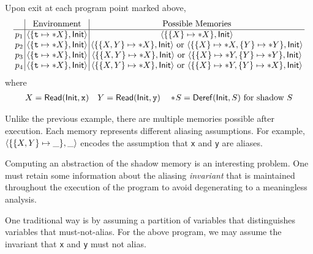 \documentclass{article}
\begin{document}
Upon exit at each program point marked above,
\[
  \setlength{\arraycolsep}{2pt}
  \begin{array}{c|c|c}
              & \text{Environment}                                      & \text{Possible Memories}                                                                                                                                                                \\
    \hline
    \ppoint_1 & \langle\{\texttt{t}\mapsto*\abbrtext{X}\},\InitE\rangle & \langle\{\{\abbrtext{X}\}\mapsto*\abbrtext{X}\},\InitE\rangle                                                                                                                           \\
    \ppoint_2 & \langle\{\texttt{t}\mapsto*\abbrtext{X}\},\InitE\rangle & \langle\{\{\abbrtext{X},\abbrtext{Y}\}\mapsto*\abbrtext{X}\},\InitE\rangle\text{ or }\langle\{\{\abbrtext{X}\}\mapsto*\abbrtext{X},\{\abbrtext{Y}\}\mapsto*\abbrtext{Y}\},\InitE\rangle \\
    \ppoint_3 & \langle\{\texttt{t}\mapsto*\abbrtext{X}\},\InitE\rangle & \langle\{\{\abbrtext{X},\abbrtext{Y}\}\mapsto*\abbrtext{X}\},\InitE\rangle\text{ or }\langle\{\{\abbrtext{X}\}\mapsto*\abbrtext{Y},\{\abbrtext{Y}\}\mapsto*\abbrtext{Y}\},\InitE\rangle \\
    \ppoint_4 & \langle\{\texttt{t}\mapsto*\abbrtext{X}\},\InitE\rangle & \langle\{\{\abbrtext{X},\abbrtext{Y}\}\mapsto*\abbrtext{X}\},\InitE\rangle\text{ or }\langle\{\{\abbrtext{X}\}\mapsto*\abbrtext{Y},\{\abbrtext{Y}\}\mapsto*\abbrtext{X}\},\InitE\rangle
  \end{array}
\]
where
\begin{align*}
  {X}=\mathsf{Read}(\mathsf{Init},\texttt{x})\quad{Y}=\mathsf{Read}(\mathsf{Init},\texttt{y})\quad*\!S=\mathsf{Deref}(\mathsf{Init},S)\text{ for shadow }S
\end{align*}

Unlike the previous example, there are multiple memories possible after
execution. Each memory represents different aliasing assumptions.
For example, $\langle\{\{{X},{Y}\}\mapsto\_\},\_\rangle$
encodes the assumption that \texttt{x} and \texttt{y} are aliases.

Computing an abstraction of the shadow memory is an interesting
problem. One must retain some information about the aliasing
\emph{invariant} that is maintained throughout the execution of the
program to avoid degenerating to a meaningless analysis.

One traditional way is by assuming a partition of variables that
distinguishes variables that must-not-alias.
For the above program, we may assume the invariant that \texttt{x} and
\texttt{y} must not alias.
\end{document}
